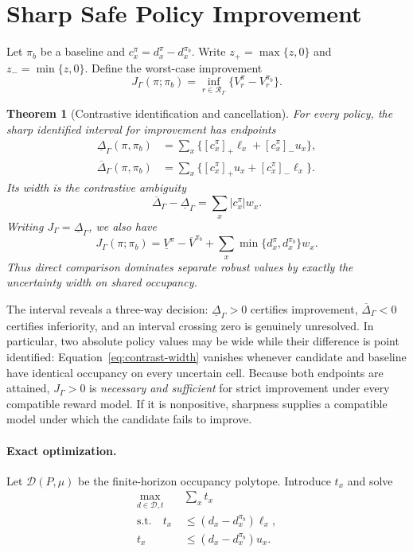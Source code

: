 \documentclass[letterpaper]{article}
\newtheorem{theorem}{Theorem}
\theoremstyle{remark}
\newcommand{\cR}{\mathcal{R}}
\newcommand{\cD}{\mathcal{D}}
\newcommand{\pos}[1]{[#1]_{+}}
\newcommand{\negp}[1]{[#1]_{-}}
\begin{document}
\section{Sharp Safe Policy Improvement}
Let $\pi_b$ be a baseline and $c_x^\pi=d_x^\pi-d_x^{\pi_b}$. Write $z_+=\max\{z,0\}$ and $z_-=\min\{z,0\}$. Define the worst-case improvement
\[
J_\Gamma(\pi;\pi_b)=\inf_{r\in\cR_\Gamma}\{V_r^\pi-V_r^{\pi_b}\}.
\]

\begin{theorem}[Contrastive identification and cancellation]\label{thm:contrast}
For every policy, the sharp identified interval for improvement has endpoints
\begin{align}
\underline\Delta_\Gamma(\pi,\pi_b)
&=\sum_x\{\pos{c_x^\pi}\ell_x+\negp{c_x^\pi}u_x\},\label{eq:contrast}\\
\overline\Delta_\Gamma(\pi,\pi_b)
&=\sum_x\{\pos{c_x^\pi}u_x+\negp{c_x^\pi}\ell_x\}.\label{eq:contrast-upper}
\end{align}
Its width is the \emph{contrastive ambiguity}
\begin{equation}
\overline\Delta_\Gamma-\underline\Delta_\Gamma
=\sum_x|c_x^\pi|w_x. \label{eq:contrast-width}
\end{equation}
Writing $J_\Gamma=\underline\Delta_\Gamma$, we also have
\begin{equation}
J_\Gamma(\pi;\pi_b)=
\underline V^\pi-\overline V^{\pi_b}
+\sum_x\min\{d_x^\pi,d_x^{\pi_b}\}w_x. \label{eq:cancel}
\end{equation}
Thus direct comparison dominates separate robust values by exactly the uncertainty width on shared occupancy.
\end{theorem}

The interval reveals a three-way decision: $\underline\Delta_\Gamma>0$ certifies improvement, $\overline\Delta_\Gamma<0$ certifies inferiority, and an interval crossing zero is genuinely unresolved. In particular, two absolute policy values may be wide while their difference is point identified: Equation~\eqref{eq:contrast-width} vanishes whenever candidate and baseline have identical occupancy on every uncertain cell. Because both endpoints are attained, $J_\Gamma>0$ is \emph{necessary and sufficient} for strict improvement under every compatible reward model. If it is nonpositive, sharpness supplies a compatible model under which the candidate fails to improve.

\paragraph{Exact optimization.}
Let $\cD(P,\mu)$ be the finite-horizon occupancy polytope. Introduce $t_x$ and solve
\begin{align}
\max_{d\in\cD,t}\quad &\sum_xt_x \label{eq:lp}\\
\text{s.t.}\quad
t_x&\leq(d_x-d_x^{\pi_b})\ell_x,\nonumber\\
t_x&\leq(d_x-d_x^{\pi_b})u_x.\nonumber
\end{align}
\end{document}
